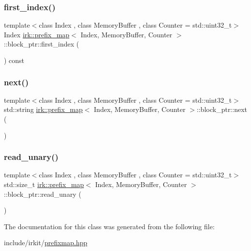 \subsubsection{\texorpdfstring{first\+\_\+index()}{first\_index()}}
{\footnotesize\ttfamily template$<$class Index , class Memory\+Buffer , class Counter  = std\+::uint32\+\_\+t$>$ \\
Index \mbox{\hyperlink{classirk_1_1prefix__map}{irk\+::prefix\+\_\+map}}$<$ Index, Memory\+Buffer, Counter $>$\+::block\+\_\+ptr\+::first\+\_\+index (\begin{DoxyParamCaption}{ }\end{DoxyParamCaption}) const\hspace{0.3cm}{\ttfamily [inline]}}

\mbox{\label{classirk_1_1prefix__map_1_1block__ptr_a8dcec33c10dd801c885773b4a2eda2c2}} 
\subsubsection{\texorpdfstring{next()}{next()}}
{\footnotesize\ttfamily template$<$class Index , class Memory\+Buffer , class Counter  = std\+::uint32\+\_\+t$>$ \\
std\+::string \mbox{\hyperlink{classirk_1_1prefix__map}{irk\+::prefix\+\_\+map}}$<$ Index, Memory\+Buffer, Counter $>$\+::block\+\_\+ptr\+::next (\begin{DoxyParamCaption}{ }\end{DoxyParamCaption})\hspace{0.3cm}{\ttfamily [inline]}}

\mbox{\label{classirk_1_1prefix__map_1_1block__ptr_afe1fc5491585abf3d5e03174fc9399b9}} 
\subsubsection{\texorpdfstring{read\+\_\+unary()}{read\_unary()}}
{\footnotesize\ttfamily template$<$class Index , class Memory\+Buffer , class Counter  = std\+::uint32\+\_\+t$>$ \\
std\+::size\+\_\+t \mbox{\hyperlink{classirk_1_1prefix__map}{irk\+::prefix\+\_\+map}}$<$ Index, Memory\+Buffer, Counter $>$\+::block\+\_\+ptr\+::read\+\_\+unary (\begin{DoxyParamCaption}{ }\end{DoxyParamCaption})\hspace{0.3cm}{\ttfamily [inline]}}



The documentation for this class was generated from the following file\+:\begin{DoxyCompactItemize}
\item 
include/irkit/\mbox{\hyperlink{prefixmap_8hpp}{prefixmap.\+hpp}}\end{DoxyCompactItemize}

